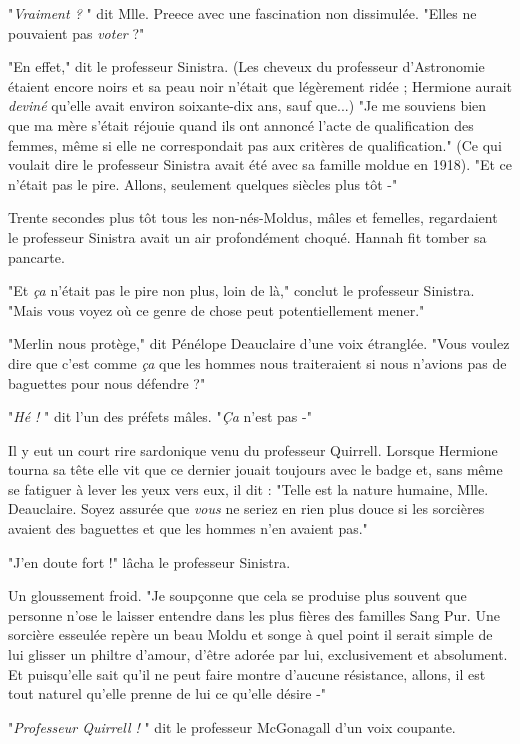"\emph{Vraiment ?} " dit Mlle. Preece avec une fascination non dissimulée. "Elles ne pouvaient pas \emph{voter } ?"

"En effet," dit le professeur Sinistra. (Les cheveux du professeur d'Astronomie étaient encore noirs et sa peau noir n'était que légèrement ridée ; Hermione aurait \emph{deviné}  qu'elle avait environ soixante-dix ans, sauf que...) "Je me souviens bien que ma mère s'était réjouie quand ils ont annoncé l'acte de qualification des femmes, même si elle ne correspondait pas aux critères de qualification." (Ce qui voulait dire le professeur Sinistra avait été avec sa famille moldue en 1918). "Et ce n'était pas le pire. Allons, seulement quelques siècles plus tôt -"

Trente secondes plus tôt tous les non-nés-Moldus, mâles et femelles, regardaient le professeur Sinistra avait un air profondément choqué. Hannah fit tomber sa pancarte.

"Et \emph{ça}  n'était pas le pire non plus, loin de là," conclut le professeur Sinistra. "Mais vous voyez où ce genre de chose peut potentiellement mener."

"Merlin nous protège," dit Pénélope Deauclaire d'une voix étranglée. "Vous voulez dire que c'est comme \emph{ça}  que les hommes nous traiteraient si nous n'avions pas de baguettes pour nous défendre ?"

"\emph{Hé !} " dit l'un des préfets mâles. "\emph{Ça}  n'est pas -"

Il y eut un court rire sardonique venu du professeur Quirrell. Lorsque Hermione tourna sa tête elle vit que ce dernier jouait toujours avec le badge et, sans même se fatiguer à lever les yeux vers eux, il dit : "Telle est la nature humaine, Mlle. Deauclaire. Soyez assurée que \emph{vous}  ne seriez en rien plus douce si les sorcières avaient des baguettes et que les hommes n'en avaient pas."

"J'en doute fort !" lâcha le professeur Sinistra.

Un gloussement froid. "Je soupçonne que cela se produise plus souvent que personne n'ose le laisser entendre dans les plus fières des familles Sang Pur. Une sorcière esseulée repère un beau Moldu et songe à quel point il serait simple de lui glisser un philtre d'amour, d'être adorée par lui, exclusivement et absolument. Et puisqu'elle sait qu'il ne peut faire montre d'aucune résistance, allons, il est tout naturel qu'elle prenne de lui ce qu'elle désire -"

"\emph{Professeur Quirrell !} " dit le professeur McGonagall d'un voix coupante.


